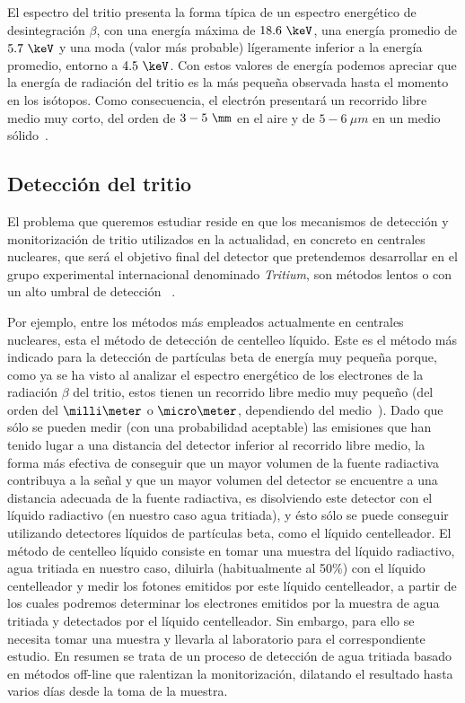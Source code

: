El espectro del tritio presenta la forma típica de un espectro energético de desintegración $\beta$, con una energía máxima de $18.6~\keV$, una energía promedio de $5.7~\keV$ y una moda (valor más probable) lígeramente inferior a la energía promedio, entorno a $4.5~\keV$. Con estos valores de energía podemos apreciar que la energía de radiación del tritio es la más pequeña observada hasta el momento en los isótopos. Como consecuencia, el electrón presentará un recorrido libre medio muy corto, del orden de $3-5~\mm$ en el aire y de $5-6~\mu m$ en un medio sólido~\cite{Isotopos}.

\subsection{Detección del tritio}

El problema que queremos estudiar  reside en que los mecanismos de detección y monitorización de tritio utilizados en la actualidad, en concreto en centrales nucleares, que será el objetivo final del detector que pretendemos desarrollar en el grupo experimental internacional denominado \textit{Tritium}, son métodos lentos o con un alto umbral de detección ~\cite{limiteMB, Limitetiempo, Limite}. 


Por ejemplo, entre los métodos más empleados actualmente en centrales nucleares, esta el método de detección  de centelleo líquido. Este es el método más indicado para la detección de partículas beta de energía muy pequeña porque, como ya se ha visto al analizar el espectro energético de los electrones de la radiación   $\beta$ del tritio, estos tienen un recorrido libre medio muy pequeño (del orden del $\milli\meter$ o $\micro\meter$, dependiendo del medio~\cite{Isotopos}). Dado que sólo se pueden medir (con una probabilidad aceptable) las emisiones que han tenido lugar a una distancia del detector inferior al recorrido libre medio, la forma más efectiva de conseguir que un mayor volumen de la fuente radiactiva contribuya a la señal y que un mayor volumen del detector se encuentre a una distancia adecuada de la fuente radiactiva, es disolviendo este detector con el líquido radiactivo (en nuestro caso agua tritiada), y ésto sólo se puede conseguir utilizando detectores líquidos de partículas beta, como el líquido centelleador. 
El método de centelleo líquido consiste en tomar una muestra del líquido radiactivo, agua tritiada en nuestro caso, diluirla (habitualmente al 50\%) con el líquido centelleador y medir los fotones emitidos por este líquido centelleador, a partir de los cuales podremos determinar los electrones emitidos por la muestra de agua tritiada y detectados por el líquido centelleador. Sin embargo, para ello se necesita tomar una muestra y llevarla al laboratorio para el correspondiente estudio. En resumen se trata de un proceso de detección de agua tritiada basado en métodos off-line que ralentizan la monitorización, dilatando el resultado hasta varios días desde la toma de la muestra. 

